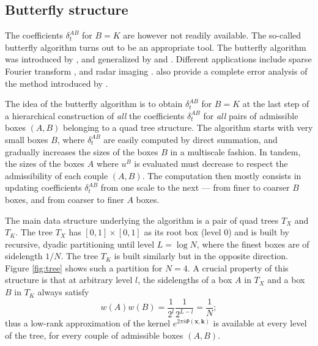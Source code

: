 

\subsection{Butterfly structure}

The coefficients $\delta_t^{AB}$ for $B=K$ are however not readily available. The so-called butterfly algorithm turns out to be an appropriate tool. The butterfly algorithm was introduced by \cite{MB96}, and generalized by \cite{OWR10} and \cite{CDY09}. Different applications include sparse Fourier transform \citep{Ying09}, and radar imaging \citep{DFMPY12}.  \cite{DFMPY12} also provide a complete error analysis of the method introduced by \cite{CDY09}.

The idea of the butterfly algorithm is to obtain $\delta_t^{AB}$ for $B=K$ at the last step of a hierarchical construction of {\it all} the coefficients $\delta_t^{AB}$ for {\it all} pairs of admissible boxes $(A,B)$ belonging to a quad tree structure. The algorithm starts with very small boxes $B$, where $\delta_t^{AB}$ are easily computed by direct summation, and gradually increases the sizes of the boxes $B$ in a multiscale fashion. In tandem, the sizes of the boxes $A$ where $u^B$ is evaluated must decrease to respect the admissibility of each couple $(A,B)$. The computation then mostly consists in updating coefficients $\delta_t^{AB}$ from one scale to the next --- from finer to coarser $B$ boxes, and from coarser to finer $A$ boxes. 

The main data structure underlying the algorithm is a pair of quad trees $T_X$ and $T_K$. The tree $T_X$ has $[0,1]\times[0,1]$ as its root box (level $0$) and is built by recursive, dyadic partitioning until level $L=\log N$, where the finest boxes are of sidelength $1/N$. The tree $T_K$ is built similarly but in the opposite direction. Figure \ref{fig:tree} shows such a partition for $N=4$. A crucial property of this structure is that at arbitrary level $l$, the sidelengths of a box $A$ in $T_X$ and a box $B$ in $T_K$ always satisfy 
\begin{equation}
w(A)w(B)=\frac{1}{2^l}\frac{1}{2^{L-l}}=\frac{1}{N};
\end{equation}
thus a low-rank approximation of the kernel $e^{2\pi i \Phi(\mathbf{x},\mathbf{k})}$ is available at every level of the tree, for every couple of admissible boxes $(A,B)$.



